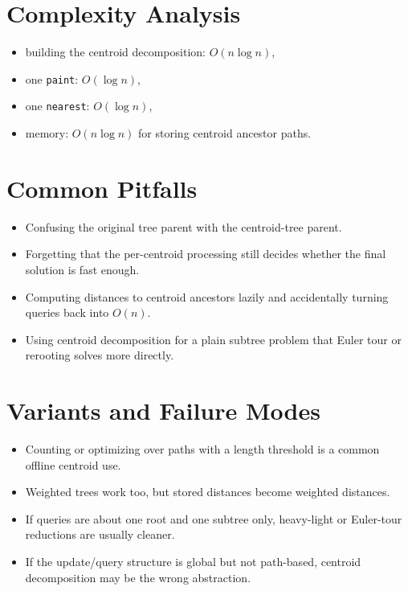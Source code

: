 \section*{Complexity Analysis}

\begin{itemize}
  \item building the centroid decomposition: \(O(n \log n)\),
  \item one \texttt{paint}: \(O(\log n)\),
  \item one \texttt{nearest}: \(O(\log n)\),
  \item memory: \(O(n \log n)\) for storing centroid ancestor paths.
\end{itemize}

\section*{Common Pitfalls}

\begin{itemize}
  \item Confusing the original tree parent with the centroid-tree parent.
  \item Forgetting that the per-centroid processing still decides whether the final solution is fast enough.
  \item Computing distances to centroid ancestors lazily and accidentally turning queries back into \(O(n)\).
  \item Using centroid decomposition for a plain subtree problem that Euler tour or rerooting solves more directly.
\end{itemize}

\section*{Variants and Failure Modes}

\begin{itemize}
  \item Counting or optimizing over paths with a length threshold is a common offline centroid use.
  \item Weighted trees work too, but stored distances become weighted distances.
  \item If queries are about one root and one subtree only, heavy-light or Euler-tour reductions are usually cleaner.
  \item If the update/query structure is global but not path-based, centroid decomposition may be the wrong abstraction.
\end{itemize}

